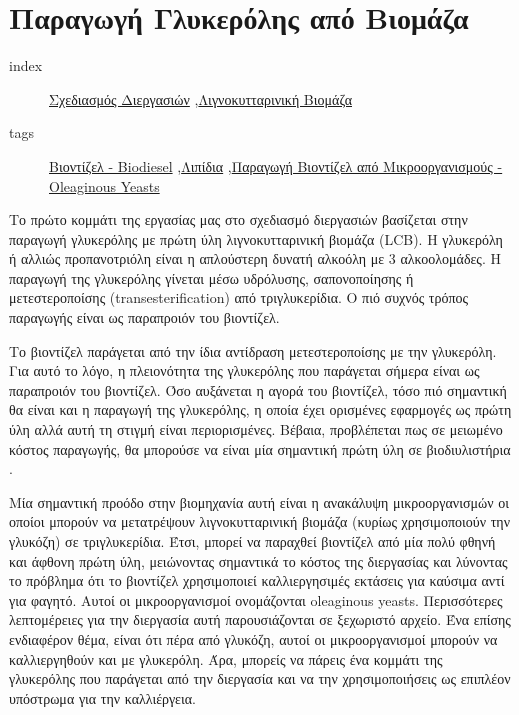 \documentclass[11pt]{article}
\begin{document}
\section{Παραγωγή Γλυκερόλης από Βιομάζα}
\label{sec:orgefdc12c}
\begin{description}
\item[{index}] \href{\detokenize{../../../../org_roam/σχεδιασμος_διεργασιων-05-10-22.org}}{Σχεδιασμός Διεργασιών} ,\href{\detokenize{../../../../org_roam/λιγνοκυτταρινικη_βιομαζα-09-11-22.org}}{Λιγνοκυτταρινική Βιομάζα}
\item[{tags}] \href{\detokenize{../../../../org_roam/βιοντιζελ-09-10-22.org}}{Βιοντίζελ - Biodiesel} ,\href{\detokenize{../../../../org_roam/λιπιδια-24-03-22.org}}{Λιπίδια} ,\href{\detokenize{../../../../org_roam/παραγωγη_βιοντιζελ_απο_μικροοργανισμους_oleaginous_yeasts-13-10-22.org}}{Παραγωγή Βιοντίζελ από Μικροοργανισμούς - Oleaginous Yeasts}
\end{description}
Το πρώτο κομμάτι της εργασίας μας στο σχεδιασμό διεργασιών βασίζεται στην παραγωγή γλυκερόλης με πρώτη ύλη λιγνοκυτταρινική βιομάζα (LCB). Η γλυκερόλη ή αλλιώς προπανοτριόλη είναι η απλούστερη δυνατή αλκοόλη με 3 αλκοολομάδες. Η παραγωγή της γλυκερόλης γίνεται μέσω υδρόλυσης, σαπονοποίησης ή μετεστεροποίσης (transesterification) από τριγλυκερίδια. Ο πιό συχνός τρόπος παραγωγής είναι ως παραπροιόν του βιοντίζελ.

Το βιοντίζελ παράγεται από την ίδια αντίδραση μετεστεροποίσης με την γλυκερόλη. Για αυτό το λόγο, η πλειονότητα της γλυκερόλης που παράγεται σήμερα είναι ως παραπροιόν του βιοντίζελ. Όσο αυξάνεται η αγορά του βιοντίζελ, τόσο πιό σημαντική θα είναι και η παραγωγή της γλυκερόλης, η οποία έχει ορισμένες εφαρμογές ως πρώτη ύλη αλλά αυτή τη στιγμή είναι περιορισμένες. Βέβαια, προβλέπεται πως σε μειωμένο κόστος παραγωγής, θα μπορούσε να είναι μία σημαντική πρώτη ύλη σε βιοδιυλιστήρια \cite{werpyTopValueAdded2004} .

Μία σημαντική προόδο στην βιομηχανία αυτή είναι η ανακάλυψη μικροοργανισμών οι οποίοι μπορούν να μετατρέψουν λιγνοκυτταρινική βιομάζα (κυρίως χρησιμοποιούν την γλυκόζη) σε τριγλυκερίδια. Έτσι, μπορεί να παραχθεί βιοντίζελ από μία πολύ φθηνή και άφθονη πρώτη ύλη, μειώνοντας σημαντικά το κόστος της διεργασίας και λύνοντας το πρόβλημα ότι το βιοντίζελ χρησιμοποιεί καλλιεργησιμές εκτάσεις για καύσιμα αντί για φαγητό. Αυτοί οι μικροοργανισμοί ονομάζονται oleaginous yeasts. Περισσότερες λεπτομέρειες για την διεργασία αυτή παρουσιάζονται σε ξεχωριστό αρχείο. Ένα επίσης ενδιαφέρον θέμα, είναι ότι πέρα από γλυκόζη, αυτοί οι μικροοργανισμοί μπορούν να καλλιεργηθούν και με γλυκερόλη. Άρα, μπορείς να πάρεις ένα κομμάτι της γλυκερόλης που παράγεται από την διεργασία και να την χρησιμοποιήσεις ως επιπλέον υπόστρωμα για την καλλιέργεια.
\end{document}
